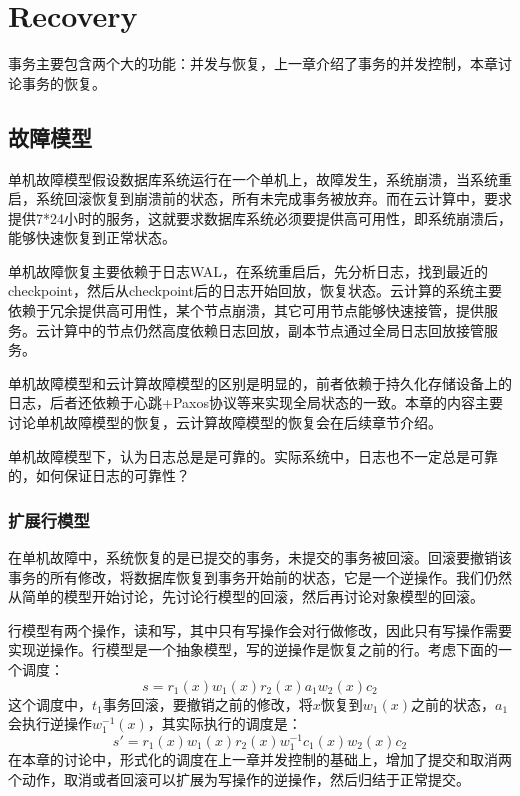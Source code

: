 \chapter{Recovery}

事务主要包含两个大的功能：并发与恢复，上一章介绍了事务的并发控制，本章讨论事务的恢复。

\section{故障模型}

单机故障模型假设数据库系统运行在一个单机上，故障发生，系统崩溃，当系统重启，系统回滚恢复到崩溃前的状态，所有未完成事务被放弃。而在云计算中，要求提供7*24小时的服务，这就要求数据库系统必须要提供高可用性，即系统崩溃后，能够快速恢复到正常状态。

单机故障恢复主要依赖于日志WAL，在系统重启后，先分析日志，找到最近的checkpoint，然后从checkpoint后的日志开始回放，恢复状态。云计算的系统主要依赖于冗余提供高可用性，某个节点崩溃，其它可用节点能够快速接管，提供服务。云计算中的节点仍然高度依赖日志回放，副本节点通过全局日志回放接管服务。

单机故障模型和云计算故障模型的区别是明显的，前者依赖于持久化存储设备上的日志，后者还依赖于心跳+Paxos协议等来实现全局状态的一致。本章的内容主要讨论单机故障模型的恢复，云计算故障模型的恢复会在后续章节介绍。

\begin{exercise}
    单机故障模型下，认为日志总是是可靠的。实际系统中，日志也不一定总是可靠的，如何保证日志的可靠性？
\end{exercise}

\subsection{扩展行模型}

在单机故障中，系统恢复的是已提交的事务，未提交的事务被回滚。回滚要撤销该事务的所有修改，将数据库恢复到事务开始前的状态，它是一个逆操作。我们仍然从简单的模型开始讨论，先讨论行模型的回滚，然后再讨论对象模型的回滚。

行模型有两个操作，读和写，其中只有写操作会对行做修改，因此只有写操作需要实现逆操作。行模型是一个抽象模型，写的逆操作是恢复之前的行。考虑下面的一个调度：
$$
s = r_1(x)w_1(x)r_2(x)a_1w_2(x)c_2
$$
这个调度中，$t_1$事务回滚，要撤销之前的修改，将$x$恢复到$w_1(x)$之前的状态，$a_1$会执行逆操作$w_1^{-1}(x)$，其实际执行的调度是：
$$
s' = r_1(x)w_1(x)r_2(x)w_1^{-1}c_1(x)w_2(x)c_2
$$
在本章的讨论中，形式化的调度在上一章并发控制的基础上，增加了提交和取消两个动作，取消或者回滚可以扩展为写操作的逆操作，然后归结于正常提交。

